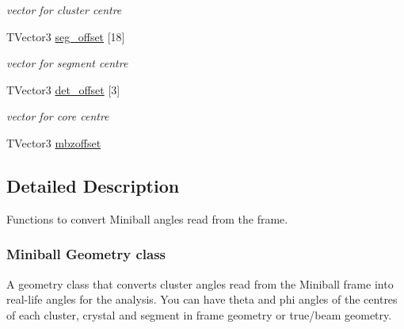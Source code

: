 \begin{DoxyCompactItemize}
\begin{DoxyCompactList}\small\item\em vector for cluster centre \end{DoxyCompactList}\item 
\hypertarget{class_m_b_geometry_ac57631254a9e9b3eaf3a1fc67c151c87}{T\-Vector3 \hyperlink{class_m_b_geometry_ac57631254a9e9b3eaf3a1fc67c151c87}{seg\-\_\-offset} \mbox{[}18\mbox{]}}\label{class_m_b_geometry_ac57631254a9e9b3eaf3a1fc67c151c87}

\begin{DoxyCompactList}\small\item\em vector for segment centre \end{DoxyCompactList}\item 
\hypertarget{class_m_b_geometry_a69cee4387af836d2c87d7d06f19b80ea}{T\-Vector3 \hyperlink{class_m_b_geometry_a69cee4387af836d2c87d7d06f19b80ea}{det\-\_\-offset} \mbox{[}3\mbox{]}}\label{class_m_b_geometry_a69cee4387af836d2c87d7d06f19b80ea}

\begin{DoxyCompactList}\small\item\em vector for core centre \end{DoxyCompactList}\item 
T\-Vector3 \hyperlink{class_m_b_geometry_a687268aeee7a0e2edc0486a76a07affe}{mbzoffset}
\end{DoxyCompactItemize}


\subsection{Detailed Description}
Functions to convert Miniball angles read from the frame. 



 \subsubsection*{Miniball Geometry class }

A geometry class that converts cluster angles read from the Miniball frame into real-\/life angles for the analysis. You can have theta and phi angles of the centres of each cluster, crystal and segment in frame geometry or true/beam geometry. 

